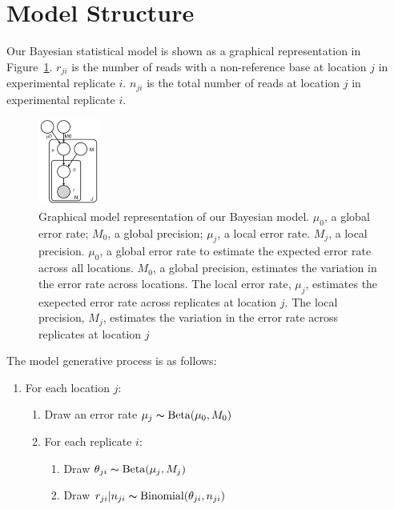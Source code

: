 \documentclass{article}
\begin{document}
\section{Model Structure}
Our Bayesian statistical model is shown as a graphical representation in Figure~\ref{tbl:graphical_model}. $r_{ji}$ is the number of reads with a non-reference base at location $j$ in experimental replicate $i$. $n_{ji}$ is the total number of reads at location $j$ in experimental replicate $i$. 
\begin{figure}[htpb]
\centering
\vspace{-10pt}
\includegraphics[width=0.18\textwidth]{figs/RVD3_model.pdf}
\caption{Graphical model representation of our Bayesian model.
$\mu_0$, a global error rate; $M_0$, a global precision;  $ \mu_j $, a local error rate. $M_j$, a local precision. $\mu_0$, a global error rate to estimate the expected error rate across all locations. $M_0$, a global precision, estimates the variation in the error rate  across locations. The local error rate, $ \mu_j $, estimates the exepected error rate across replicates at location $ j $. The local precision, $M_j$, estimates the variation in the error rate across replicates at location $j$}
\label{tbl:graphical_model}
\end{figure}
The model generative process is as follows:
\begin{enumerate}[noitemsep]
	\item For each location $j$:
	\begin{enumerate}
		\item Draw an error rate $\mu_j \thicksim \text{Beta}(\mu_0, M_0)$
		\item For each replicate $i$:
		\begin{enumerate}
			\item Draw $\theta_{ji} \thicksim \text{Beta}(\mu_j, M_j)$
			\item Draw $r_{ji} | n_{ji} \thicksim \text{Binomial}(\theta_{ji}, n_{ji})$
		\end{enumerate}
	\end{enumerate}
\end{enumerate}
\end{document}
